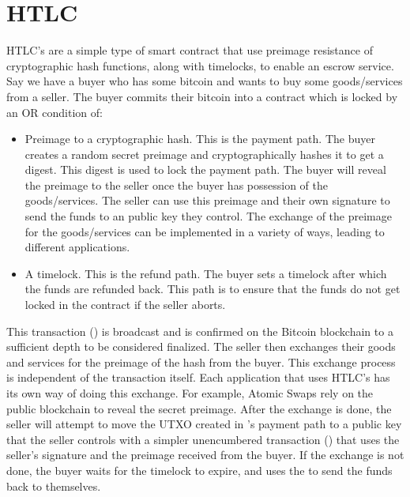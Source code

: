\section{HTLC}
HTLC's are a simple type of smart contract that use preimage resistance of cryptographic hash functions, along with timelocks, to enable an escrow service. Say we have a buyer who has some bitcoin and wants to buy some goods/services from a seller. The buyer commits their bitcoin into a contract which is locked by an OR condition of:
\begin{itemize}
    \item Preimage to a cryptographic hash. This is the payment path. The buyer creates a random secret preimage and cryptographically hashes it to get a digest. This digest is used to lock the payment path. The buyer will reveal the preimage to the seller once the buyer has possession of the goods/services. The seller can use this preimage and their own signature to send the funds to an public key they control. The exchange of the preimage for the goods/services can be implemented in a variety of ways, leading to different applications.
    \item A timelock. This is the refund path. The buyer sets a timelock after which the funds are refunded back. This path is to ensure that the funds do not get locked in the contract if the seller aborts. 
\end{itemize}

This transaction (\htlctxn{}) is broadcast and is confirmed on the Bitcoin blockchain to a sufficient depth to be considered finalized. The seller then exchanges their goods and services for the preimage of the hash from the buyer. This exchange process is independent of the transaction itself. Each application that uses HTLC's has its own way of doing this exchange. For example, Atomic Swaps rely on the public blockchain to reveal the secret preimage. After the exchange is done, the seller will attempt to move the UTXO created in \htlctxn{}'s payment path to a public key that the seller controls with a simpler unencumbered transaction (\sellertxn{}) that uses the seller's signature and the preimage received from the buyer. If the exchange is not done, the buyer waits for the timelock to expire, and uses the  to send the funds back to themselves.

